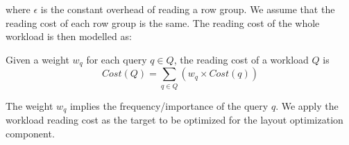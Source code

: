 where $\epsilon$ is the constant overhead of reading a row group.
We assume that the reading cost of each row group is the same.
The reading cost of the whole workload is then modelled as:

\begin{Definition}\label{equ:wcost}
	Given a weight $w_q$ for each query $q\in Q$, the reading cost of a workload $Q$ is
	\begin{equation}
	Cost(Q) = \sum_{q\in Q}(w_q\times Cost(q))
	\label{equ:workloadcost}
	\end{equation}
\end{Definition}

The weight $w_q$ implies the frequency/importance of the query $q$. We apply the workload reading cost as the target to be optimized for the layout optimization component.
